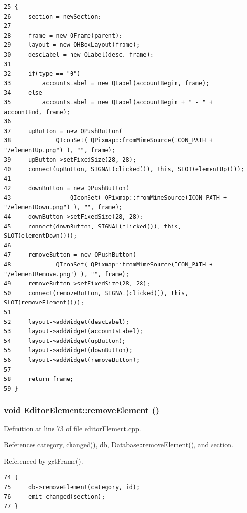 \footnotesize\begin{verbatim}25 {
26     section = newSection;
27     
28     frame = new QFrame(parent);
29     layout = new QHBoxLayout(frame);
30     descLabel = new QLabel(desc, frame);
31    
32     if(type == "0")
33         accountsLabel = new QLabel(accountBegin, frame);
34     else
35         accountsLabel = new QLabel(accountBegin + " - " + accountEnd, frame);
36     
37     upButton = new QPushButton(
38             QIconSet( QPixmap::fromMimeSource(ICON_PATH + "/elementUp.png") ), "", frame);
39     upButton->setFixedSize(28, 28);
40     connect(upButton, SIGNAL(clicked()), this, SLOT(elementUp()));
41     
42     downButton = new QPushButton(
43                 QIconSet( QPixmap::fromMimeSource(ICON_PATH + "/elementDown.png") ), "", frame);
44     downButton->setFixedSize(28, 28);
45     connect(downButton, SIGNAL(clicked()), this, SLOT(elementDown()));
46     
47     removeButton = new QPushButton(
48             QIconSet( QPixmap::fromMimeSource(ICON_PATH + "/elementRemove.png") ), "", frame);
49     removeButton->setFixedSize(28, 28);
50     connect(removeButton, SIGNAL(clicked()), this, SLOT(removeElement()));
51     
52     layout->addWidget(descLabel);
53     layout->addWidget(accountsLabel);
54     layout->addWidget(upButton);
55     layout->addWidget(downButton);
56     layout->addWidget(removeButton);
57     
58     return frame;
59 }
\end{verbatim}\normalsize 


\hypertarget{classEditorElement_k2}{
\subsubsection[removeElement]{\setlength{\rightskip}{0pt plus 5cm}void Editor\-Element::remove\-Element ()}}
\label{classEditorElement_k2}


Definition at line 73 of file editor\-Element.cpp.

References category, changed(), db, Database::remove\-Element(), and section.

Referenced by get\-Frame().

\footnotesize\begin{verbatim}74 {
75     db->removeElement(category, id);
76     emit changed(section);
77 }
\end{verbatim}\normalsize 




